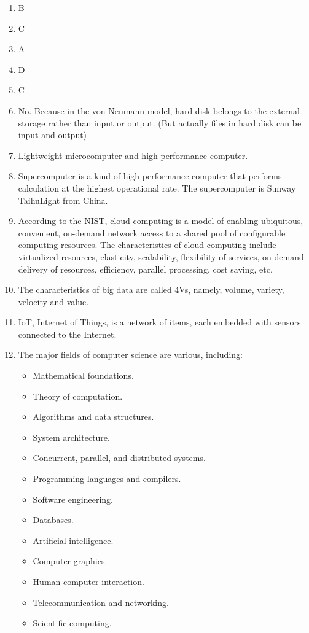 \documentclass{article}
\begin{document}
\begin{enumerate}
        \item B
        \item C
        \item A
        \item D
        \item C
        \item No. Because in the von Neumann model, hard disk belongs to the external storage rather than input or output. (But actually files in hard disk can be input and output)
        \item  Lightweight microcomputer and high performance computer.
        \item Supercomputer is a kind of high performance computer that performs calculation at the highest operational rate. The supercomputer is Sunway TaihuLight from China.
        \item According to the NIST, cloud computing is a model of enabling ubiquitous, convenient, on-demand network access to a shared pool of configurable computing resources. The characteristics of cloud computing include virtualized resources, elasticity, scalability, flexibility of services, on-demand delivery of resources, efficiency, parallel processing, cost saving, etc.
        \item The characteristics of big data are called 4Vs, namely, volume, variety, velocity and value.
        \item IoT, Internet of Things, is a network of items, each embedded with sensors connected to the Internet.
        \item {The major fields of computer science are various, including:
        \begin{itemize}
            \item Mathematical foundations.
            \item Theory of computation.
            \item Algorithms and data structures.
            \item System architecture.
            \item Concurrent, parallel, and distributed systems.
            \item Programming languages and compilers.
            \item Software engineering.
            \item Databases.
            \item Artificial intelligence.
            \item Computer graphics.
            \item Human computer interaction.
            \item Telecommunication and networking.
            \item Scientific computing.
        \end{itemize}
        }
    \end{enumerate}
\end{document}
